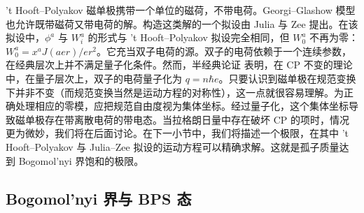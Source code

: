 't Hooft–Polyakov 磁单极携带一个单位的磁荷，不带电荷。Georgi–Glashow 模型也允许既带磁荷又带电荷的解。构造这类解的一个拟设由 Julia 与 Zee \cite{Julia-Zee} 提出。在该拟设中，$\phi^a$ 与 $W^a_i$ 的形式与 't Hooft–Polyakov 拟设完全相同，但 $W^a_0$ 不再为零：$W^a_0=x^a J(aer)/er^2$。它充当双子电荷的源。双子的电荷依赖于一个连续参数，在经典层次上并不满足量子化条件。然而，半经典论证 \cite{TW1,GSW} 表明，在 CP 不变的理论中，在量子层次上，双子的电荷量子化为 $q=n\hbar e$。只要认识到磁单极在规范变换下并非不变（而规范变换当然是运动方程的对称性），这一点就很容易理解。为正确处理相应的零模，应把规范自由度视为集体坐标。经过量子化，这个集体坐标导致磁单极存在带离散电荷的带电态。当拉格朗日量中存在破坏 CP 的项时，情况更为微妙，我们将在后面讨论。在下一小节中，我们将描述一个极限，在其中 't Hooft–Polyakov 与 Julia–Zee 拟设的运动方程可以精确求解。这就是孤子质量达到 Bogomol'nyi 界饱和的极限。

\subsection{Bogomol'nyi 界与 BPS 态}


